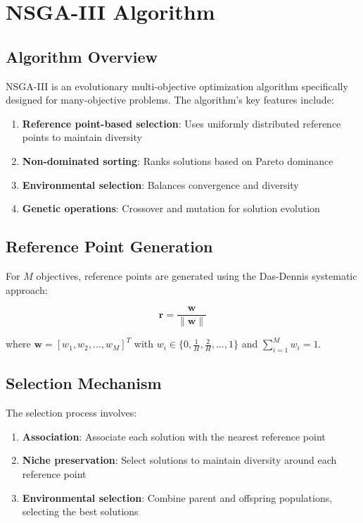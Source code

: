 \documentclass[12pt,a4paper]{article}
\begin{document}
\section{NSGA-III Algorithm}

\subsection{Algorithm Overview}

NSGA-III is an evolutionary multi-objective optimization algorithm specifically designed for many-objective problems. The algorithm's key features include:

\begin{enumerate}
    \item \textbf{Reference point-based selection}: Uses uniformly distributed reference points to maintain diversity
    \item \textbf{Non-dominated sorting}: Ranks solutions based on Pareto dominance
    \item \textbf{Environmental selection}: Balances convergence and diversity
    \item \textbf{Genetic operations}: Crossover and mutation for solution evolution
\end{enumerate}

\subsection{Reference Point Generation}

For $M$ objectives, reference points are generated using the Das-Dennis systematic approach:

\begin{equation}
\mathbf{r} = \frac{\mathbf{w}}{\|\mathbf{w}\|}
\end{equation}

where $\mathbf{w} = [w_1, w_2, \ldots, w_M]^T$ with $w_i \in \{0, \frac{1}{H}, \frac{2}{H}, \ldots, 1\}$ and $\sum_{i=1}^{M} w_i = 1$.

\subsection{Selection Mechanism}

The selection process involves:

\begin{enumerate}
    \item \textbf{Association}: Associate each solution with the nearest reference point
    \item \textbf{Niche preservation}: Select solutions to maintain diversity around each reference point
    \item \textbf{Environmental selection}: Combine parent and offspring populations, selecting the best solutions
\end{enumerate}
\end{document}
